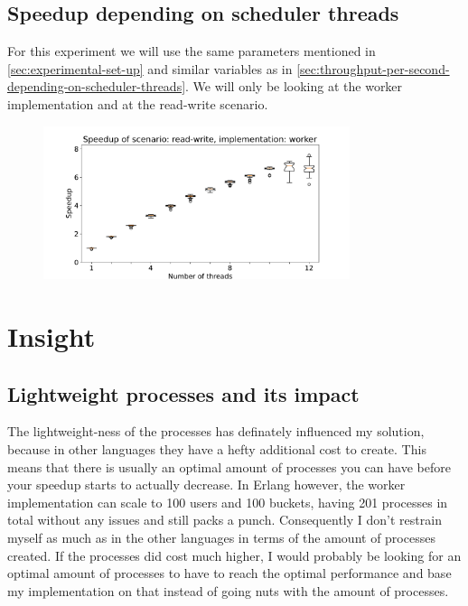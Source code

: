 \documentclass{article}
\begin{document}
\subsection{Speedup depending on scheduler threads}
For this experiment we will use the same parameters mentioned in
\autoref{sec:experimental-set-up} and similar variables as in
\autoref{sec:throughput-per-second-depending-on-scheduler-threads}. We will only
be looking at the worker implementation and at the read-write scenario.
\begin{figure}
	\centering
	\includegraphics[width=0.8\textwidth]{boxplots/omen/boxplot-speedup-of-scenario-read-write-implementation-worker.pdf}


\end{figure}
\section{Insight}
\subsection{Lightweight processes and its impact}
The lightweight-ness of the processes has definately influenced my solution,
because in other languages they have a hefty additional cost to create. This
means that there is usually an optimal amount of processes you can have before
your speedup starts to actually decrease. In Erlang however, the
worker implementation can scale to 100 users and 100 buckets, having 201
processes in total without any issues and still packs a punch. Consequently
I don't restrain myself as much as in the other languages in terms of the amount of processes created.
If the processes did cost much higher, I would probably be looking for an
optimal amount of processes to have to reach the optimal performance and base my
implementation on that instead of going nuts with the amount of processes.
\end{document}
